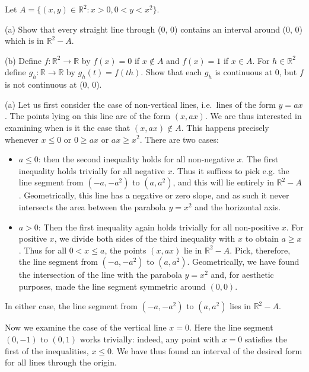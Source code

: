     \begin{exercise}{26}
        Let $A = \{(x, y) \in \mathbb{R}^2 : x > 0, 0 < y < x^2\}$.

        (a) Show that every straight line through (0, 0) contains an interval around (0, 0) which is in $\mathbb{R}^2 - A$.

        (b) Define $f: \mathbb{R}^2 \rightarrow \mathbb{R}$ by $f(x) = 0$ if $x \notin A$ and $f(x) = 1$ if $x \in A$. For $h \in \mathbb{R}^2$ define $g_h : \mathbb{R} \rightarrow \mathbb{R}$ by $g_h(t) = f(th)$. Show that each $g_h$ is continuous at 0, but $f$ is not continuous at (0, 0).
    \end{exercise}

    \begin{solution}

        (a) Let us first consider the case of non-vertical lines, i.e.\ lines of the form $y = ax$. The points lying on this line are of the form $(x, ax)$. We are thus interested in examining when is it the case that $(x, ax) \notin A$. This happens precisely whenever $x \leq 0$ or $0 \geq ax$ or $ax \geq x^2$. There are two cases:
        \begin{itemize}
            \item $a \leq 0$: then the second inequality holds for all non-negative $x$. The first inequality holds trivially for all negative $x$. Thus it suffices to pick e.g. the line segment from $(-a, -a^2)$ to $(a, a^2)$, and this will lie entirely in $\mathbb{R}^2 - A$. Geometrically, this line has a negative or zero slope, and as such it never intersects the area between the parabola $y = x^2$ and the horizontal axis.
            \item $a > 0$: Then the first inequality again holds trivially for all non-positive $x$.  For positive $x$, we divide both sides of the third inequality with $x$ to obtain $a \geq x$. Thus for all $ 0 < x \leq a$, the points $(x, ax)$ lie in $\mathbb{R}^2 - A$. Pick, therefore, the line segment from $(-a, -a^2)$ to $(a, a^2)$. Geometrically, we have found the intersection of the line with the parabola $y=x^2$ and, for aesthetic purposes, made the line segment symmetric around $(0, 0)$.
        \end{itemize}
        In either case, the line segment from $(-a, -a^2)$ to $(a, a^2)$ lies in $\mathbb{R}^2 - A$.

        Now we examine the case of the vertical line $x = 0$. Here the line segment $(0, -1)$ to $(0, 1)$ works trivially: indeed, any point with $x = 0$ satisfies the first of the inequalities, $x \leq 0$. We have thus found an interval of the desired form for all lines through the origin.


\end{solution}
